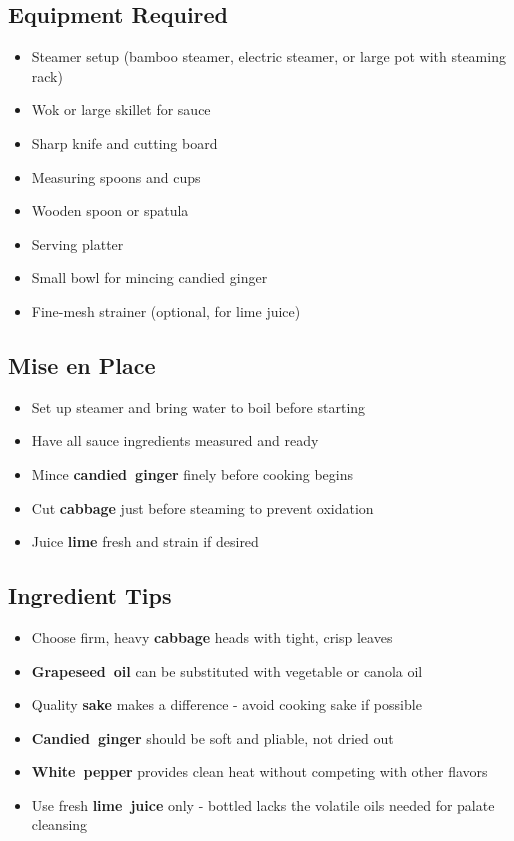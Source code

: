 \documentclass[11pt,letterpaper]{article}
\begin{document}
{\small
\setlength{\columnsep}{20pt}
\setlength{\multicolsep}{6pt}
\begin{multicols}{2}
\setlength{\parindent}{0pt}
\setlength{\parskip}{4pt}

\subsection*{Equipment Required}
\begin{itemize}
    \item Steamer setup (bamboo steamer, electric steamer, or large pot with steaming rack)
    \item Wok or large skillet for sauce
    \item Sharp knife and cutting board
    \item Measuring spoons and cups
    \item Wooden spoon or spatula
    \item Serving platter
    \item Small bowl for mincing candied ginger
    \item Fine-mesh strainer (optional, for lime juice)
\end{itemize}

\subsection*{Mise en Place}
\begin{itemize}
    \item Set up steamer and bring water to boil before starting
    \item Have all sauce ingredients measured and ready
    \item Mince \textbf{candied~ginger} finely before cooking begins
    \item Cut \textbf{cabbage} just before steaming to prevent oxidation
    \item Juice \textbf{lime} fresh and strain if desired
\end{itemize}

\subsection*{Ingredient Tips}
\begin{itemize}
    \item Choose firm, heavy \textbf{cabbage} heads with tight, crisp leaves
    \item \textbf{Grapeseed~oil} can be substituted with vegetable or canola oil
    \item Quality \textbf{sake} makes a difference - avoid cooking sake if possible
    \item \textbf{Candied~ginger} should be soft and pliable, not dried out
    \item \textbf{White~pepper} provides clean heat without competing with other flavors
    \item Use fresh \textbf{lime~juice} only - bottled lacks the volatile oils needed for palate cleansing
\end{itemize}


\end{multicols}}
\end{document}
